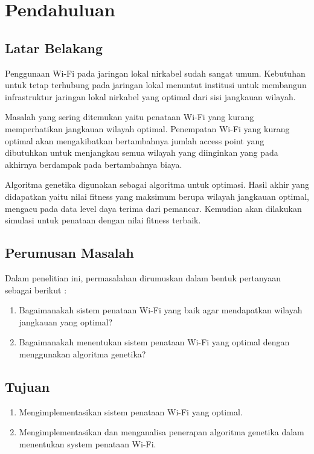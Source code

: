 \documentclass[12pt,a4paper,oneside,titlepage]{report}
\begin{document}
		\chapter{Pendahuluan}
		\section{Latar Belakang}
		Penggunaan Wi-Fi pada jaringan lokal nirkabel sudah sangat umum. Kebutuhan untuk tetap terhubung pada jaringan lokal menuntut institusi untuk membangun infrastruktur jaringan lokal nirkabel yang optimal dari sisi jangkauan wilayah.
		 
		Masalah yang sering ditemukan yaitu penataan Wi-Fi yang kurang memperhatikan jangkauan wilayah optimal. Penempatan Wi-Fi yang kurang optimal akan mengakibatkan bertambahnya jumlah access point yang dibutuhkan untuk menjangkau semua wilayah yang diinginkan yang pada akhirnya berdampak pada bertambahnya biaya. 
		
		Algoritma genetika digunakan sebagai algoritma untuk optimasi. Hasil akhir yang didapatkan yaitu nilai fitness yang maksimum berupa wilayah jangkauan optimal, mengacu pada data level daya terima dari pemancar. Kemudian akan dilakukan simulasi untuk penataan dengan nilai fitness terbaik.
		\section{Perumusan Masalah}
		Dalam penelitian ini, permasalahan dirumuskan dalam bentuk pertanyaan sebagai berikut :
		\begin{enumerate}
			\item Bagaimanakah sistem penataan Wi-Fi yang baik agar mendapatkan wilayah jangkauan yang optimal?
			\item Bagaimanakah menentukan sistem penataan Wi-Fi yang optimal dengan menggunakan algoritma genetika?
		\end{enumerate}
		\section{Tujuan}
		\begin{enumerate}
			\item Mengimplementasikan sistem penataan Wi-Fi yang optimal.
			\item Mengimplementasikan dan menganalisa penerapan algoritma genetika dalam menentukan system penataan Wi-Fi.
		\end{enumerate}
\end{document}
